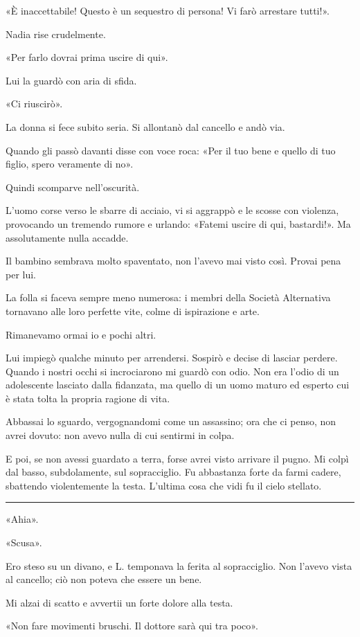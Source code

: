 «È inaccettabile! Questo è un sequestro di persona! Vi farò arrestare tutti!».

Nadia rise crudelmente.

«Per farlo dovrai prima uscire di qui».

Lui la guardò con aria di sfida.

«Ci riuscirò».

La donna si fece subito seria. Si allontanò dal cancello e andò via.

Quando gli passò davanti disse con voce roca: «Per il tuo bene e quello di tuo figlio, spero
veramente di no».

Quindi scomparve nell'oscurità.

L'uomo corse verso le sbarre di acciaio, vi si aggrappò e le scosse con violenza, provocando un
tremendo rumore e urlando: «Fatemi uscire di qui, bastardi!». Ma assolutamente nulla accadde.

Il bambino sembrava molto spaventato, non l'avevo mai visto così. Provai pena per lui.

La folla si faceva sempre meno numerosa: i membri della Società Alternativa tornavano alle loro
perfette vite, colme di ispirazione e arte.

Rimanevamo ormai io e pochi altri.

Lui impiegò qualche minuto per arrendersi. Sospirò e decise di lasciar perdere. Quando i nostri
occhi si incrociarono mi guardò con odio. Non era l'odio di un adolescente lasciato dalla fidanzata,
ma quello di un uomo maturo ed esperto cui è stata tolta la propria ragione di vita.

Abbassai lo sguardo, vergognandomi come un assassino; ora che ci penso, non avrei dovuto: non avevo
nulla di cui sentirmi in colpa.

E poi, se non avessi guardato a terra, forse avrei visto arrivare il pugno. Mi colpì dal basso,
subdolamente, sul sopracciglio. Fu abbastanza forte da farmi cadere, sbattendo violentemente la
testa. L'ultima cosa che vidi fu il cielo stellato.

\plainbreak{1}

«Ahia».

«Scusa».

Ero steso su un divano, e L. temponava la ferita al sopracciglio. Non l'avevo vista al cancello; ciò
non poteva che essere un bene.

Mi alzai di scatto e avvertii un forte dolore alla testa.

«Non fare movimenti bruschi. Il dottore sarà qui tra poco».

